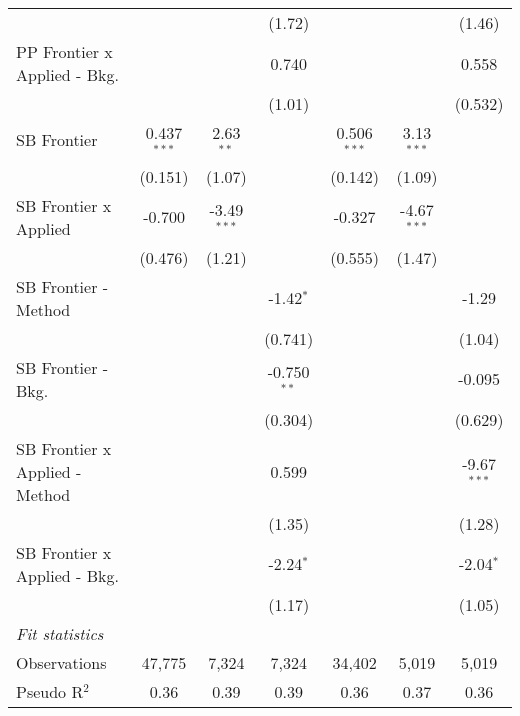 \begin{tabular}{lcccccc}
                                  &               &               & (1.72)        &               &               & (1.46)\\   
   PP Frontier x Applied - Bkg.   &               &               & 0.740         &               &               & 0.558\\   
                                  &               &               & (1.01)        &               &               & (0.532)\\   
   SB Frontier                    & 0.437$^{***}$ & 2.63$^{**}$   &               & 0.506$^{***}$ & 3.13$^{***}$  &   \\   
                                  & (0.151)       & (1.07)        &               & (0.142)       & (1.09)        &   \\   
   SB Frontier x Applied          & -0.700        & -3.49$^{***}$ &               & -0.327        & -4.67$^{***}$ &   \\   
                                  & (0.476)       & (1.21)        &               & (0.555)       & (1.47)        &   \\   
   SB Frontier - Method           &               &               & -1.42$^{*}$   &               &               & -1.29\\   
                                  &               &               & (0.741)       &               &               & (1.04)\\   
   SB Frontier - Bkg.             &               &               & -0.750$^{**}$ &               &               & -0.095\\   
                                  &               &               & (0.304)       &               &               & (0.629)\\   
   SB Frontier x Applied - Method &               &               & 0.599         &               &               & -9.67$^{***}$\\   
                                  &               &               & (1.35)        &               &               & (1.28)\\   
   SB Frontier x Applied - Bkg.   &               &               & -2.24$^{*}$   &               &               & -2.04$^{*}$\\   
                                  &               &               & (1.17)        &               &               & (1.05)\\   
   \midrule
   \emph{Fit statistics}\\
   Observations                   & 47,775        & 7,324         & 7,324         & 34,402        & 5,019         & 5,019\\  
   Pseudo R$^2$                   & 0.36          & 0.39          & 0.39          & 0.36          & 0.37          & 0.36\\  
   

\end{tabular}
